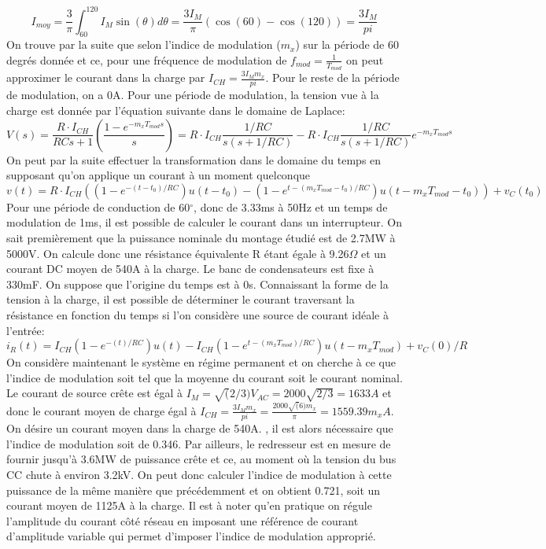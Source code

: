 \begin{equation}
I_{moy} = \frac{3}{\pi}\int_{60}^{120} I_M \sin(\theta)d\theta = \frac{3I_M}{\pi}\left( \cos(60)-\cos(120)\right) = \frac{3I_M}{pi}
\end{equation}
On trouve par la suite que selon l'indice de modulation ($m_x$) sur la période de 60 degrés donnée et ce, pour une fréquence de modulation de $f_{mod} = \frac{1}{T_{mod}}$ on peut approximer le courant dans la charge par $I_{CH} = \frac{3I_M m_x}{pi}$. Pour le reste de la période de modulation, on a 0A. Pour une période de modulation, la tension vue à la charge est donnée par l'équation suivante dans le domaine de Laplace:
\begin{equation}
V(s) = \frac{R\cdot I_{CH}}{RCs + 1} \left(\frac{1 - e^{-m_xT_{mod}s}}{s}\right) = R\cdot I_{CH}\frac{1/RC}{s(s + 1/RC)} - R\cdot I_{CH}\frac{1/RC}{s(s + 1/RC)}e^{-m_xT_{mod}s}
\end{equation}
On peut par la suite effectuer la transformation dans le domaine du temps en supposant qu'on applique un courant à un moment quelconque
\begin{equation}
v(t) = R\cdot I_{CH}\left((1-e^{-(t-t_0)/RC})u(t-t_0) - (1-e^{t-(m_xT_{mod}-t_0)/RC})u(t-m_xT_{mod}-t_0)\right) + v_C(t_0)
\end{equation}
Pour une période de conduction de 60$^\circ$, donc de 3.33ms à 50Hz et un temps de modulation de 1ms, il est possible de calculer le courant dans un interrupteur. On sait premièrement que la puissance nominale du montage étudié est de 2.7MW à 5000V. On calcule donc une résistance équivalente R étant égale à 9.26$\Omega$ et un courant DC moyen de 540A à la charge. Le banc de condensateurs est fixe à 330mF. On suppose que l'origine du temps est à 0s. Connaissant la forme de la tension à la charge, il est possible de déterminer le courant traversant la résistance en fonction du temps si l'on considère une source de courant idéale à l'entrée:
\begin{equation}
i_R(t) = I_{CH}(1-e^{-(t)/RC})u(t) - I_{CH}(1-e^{t-(m_xT_{mod})/RC})u(t-m_xT_{mod}) + v_C(0)/R
\end{equation}
On considère maintenant le système en régime permanent et on cherche  à ce que l'indice de modulation soit tel que la moyenne du courant soit le courant nominal. Le courant de source crête est égal à $I_M = \sqrt(2/3)V_{AC} = 2000\sqrt{2/3} = 1633A$ et donc le courant moyen de charge égal à $I_{CH} = \frac{3I_M m_x}{pi} = \frac{2000\sqrt(6)m_x}{\pi} = 1559.39m_xA$. On désire un courant moyen dans la charge de 540A. , il est alors nécessaire que l'indice de modulation soit de 0.346. 
Par ailleurs, le redresseur est en mesure de fournir jusqu'à 3.6MW de puissance crête et ce, au moment où la tension du bus CC chute à environ 3.2kV. On peut donc calculer l'indice de modulation à cette puissance de la même manière que précédemment et on obtient 0.721, soit un courant moyen de 1125A à la charge. Il est à noter qu'en pratique on régule l'amplitude du courant côté réseau en imposant une référence de courant d'amplitude variable qui permet d'imposer l'indice de modulation approprié.

